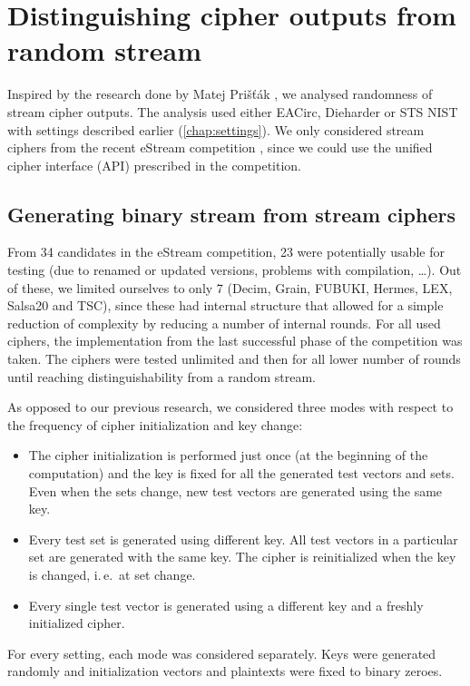 \documentclass[12pt,oneside]{fithesis2}
\begin{document}
\chapter{Distinguishing cipher outputs from random stream}
\label{chap:distinguish-cipher}

Inspired by the research done by Matej Prišťák \parencite{thesis-pristak}, we analysed randomness of stream cipher outputs.
The analysis used either EACirc, Dieharder or STS NIST with settings described earlier (\autoref{chap:settings}).
We only considered stream ciphers from the recent eStream competition \parencite{estream-competition},
since we could use the unified cipher interface (API) prescribed in the competition.

\section{Generating binary stream from stream ciphers}
\label{sec:estream-settings}

From 34 candidates in the eStream competition, 23 were potentially usable for testing (due to renamed or updated versions, 
problems with compilation, \dots). Out of these, we limited ourselves to only 7 (Decim, Grain, FUBUKI, Hermes, LEX, Salsa20 and TSC),
since these had internal structure that allowed for a simple reduction of complexity by reducing a number of internal rounds.
For all used ciphers, the implementation from the last successful phase of the competition was taken. 
The ciphers were tested unlimited and then for all lower number of rounds until reaching distinguishability from a random stream.

As opposed to our previous research, we considered three modes with respect to the frequency of cipher initialization and key change:
\begin{itemize} \rightskip=2em
\item The cipher initialization is performed just once (at the beginning of the computation) and the key is fixed for
all the generated test vectors and sets. Even when the sets change, new test vectors are generated using the same key.
\item Every test set is generated using different key. All test vectors in a particular set are generated with the same key.
The cipher is reinitialized when the key is changed, i.\,e.\ at set change.
\item Every single test vector is generated using a different key and a freshly initialized cipher.
\end{itemize}
For every setting, each mode was considered separately. Keys were generated randomly and initialization vectors and plaintexts
were fixed to binary zeroes.
\end{document}
